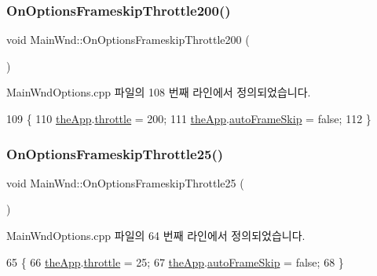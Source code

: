 \subsubsection{\texorpdfstring{On\+Options\+Frameskip\+Throttle200()}{OnOptionsFrameskipThrottle200()}}
{\footnotesize\ttfamily void Main\+Wnd\+::\+On\+Options\+Frameskip\+Throttle200 (\begin{DoxyParamCaption}{ }\end{DoxyParamCaption})\hspace{0.3cm}{\ttfamily [protected]}}



Main\+Wnd\+Options.\+cpp 파일의 108 번째 라인에서 정의되었습니다.


\begin{DoxyCode}
109 \{
110   \mbox{\hyperlink{_v_b_a_8cpp_a8095a9d06b37a7efe3723f3218ad8fb3}{theApp}}.\mbox{\hyperlink{class_v_b_a_af21b98509a2589b38e4787f065b40a2b}{throttle}} = 200;  
111   \mbox{\hyperlink{_v_b_a_8cpp_a8095a9d06b37a7efe3723f3218ad8fb3}{theApp}}.\mbox{\hyperlink{class_v_b_a_a9ecbee7d82db73b24aee3afb66128388}{autoFrameSkip}} = \textcolor{keyword}{false};
112 \}
\end{DoxyCode}
\mbox{\label{class_main_wnd_aabf5abcedfd47af722f1c42e8363b568}} 
\subsubsection{\texorpdfstring{On\+Options\+Frameskip\+Throttle25()}{OnOptionsFrameskipThrottle25()}}
{\footnotesize\ttfamily void Main\+Wnd\+::\+On\+Options\+Frameskip\+Throttle25 (\begin{DoxyParamCaption}{ }\end{DoxyParamCaption})\hspace{0.3cm}{\ttfamily [protected]}}



Main\+Wnd\+Options.\+cpp 파일의 64 번째 라인에서 정의되었습니다.


\begin{DoxyCode}
65 \{
66   \mbox{\hyperlink{_v_b_a_8cpp_a8095a9d06b37a7efe3723f3218ad8fb3}{theApp}}.\mbox{\hyperlink{class_v_b_a_af21b98509a2589b38e4787f065b40a2b}{throttle}} = 25;  
67   \mbox{\hyperlink{_v_b_a_8cpp_a8095a9d06b37a7efe3723f3218ad8fb3}{theApp}}.\mbox{\hyperlink{class_v_b_a_a9ecbee7d82db73b24aee3afb66128388}{autoFrameSkip}} = \textcolor{keyword}{false};
68 \}
\end{DoxyCode}
\mbox{\label{class_main_wnd_a40d884dcce34c24b6fa501f8e056af46}} 
